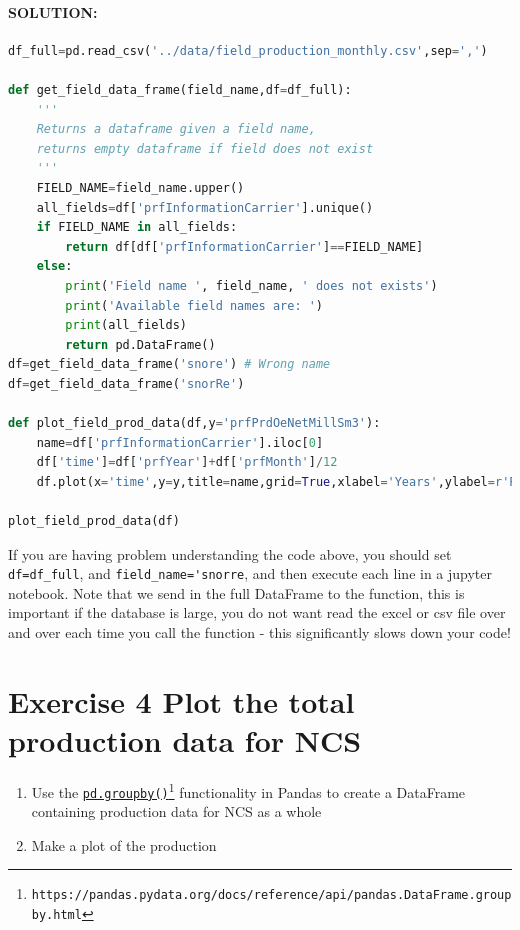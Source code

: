 \documentclass[%
twoside,                 %
final,                   %
10pt]{article}
\begin{document}
\paragraph{SOLUTION:}



























\begin{lstlisting}[language=Python,style=blue1bar]
df_full=pd.read_csv('../data/field_production_monthly.csv',sep=',')

def get_field_data_frame(field_name,df=df_full):
    '''
    Returns a dataframe given a field name, 
    returns empty dataframe if field does not exist 
    '''
    FIELD_NAME=field_name.upper()
    all_fields=df['prfInformationCarrier'].unique()
    if FIELD_NAME in all_fields:
        return df[df['prfInformationCarrier']==FIELD_NAME]
    else:
        print('Field name ', field_name, ' does not exists')
        print('Available field names are: ')
        print(all_fields)
        return pd.DataFrame()
df=get_field_data_frame('snore') # Wrong name
df=get_field_data_frame('snorRe')

def plot_field_prod_data(df,y='prfPrdOeNetMillSm3'):
    name=df['prfInformationCarrier'].iloc[0] 
    df['time']=df['prfYear']+df['prfMonth']/12
    df.plot(x='time',y=y,title=name,grid=True,xlabel='Years',ylabel=r'Production per month [mill Sm$^3$]')

plot_field_prod_data(df)

\end{lstlisting}

If you are having problem understanding the code above, you should set \Verb!df=df_full!, and \Verb!field_name='snorre!, and then execute each line in a jupyter notebook. Note that we send in the full DataFrame to the function, this is important if the database is large, you do not want read the excel or csv file over and over each time you call the function - this significantly slows down your code!

\section{Exercise 4 Plot the total production data for NCS}
\begin{enumerate}
\item Use the \href{{https://pandas.pydata.org/docs/reference/api/pandas.DataFrame.groupby.html}}{\nolinkurl{pd.groupby()}\footnote{\texttt{https://pandas.pydata.org/docs/reference/api/pandas.DataFrame.groupby.html}}}  functionality in Pandas to create a DataFrame containing production data for NCS as a whole

\item Make a plot of the production
\end{enumerate}
\end{document}
